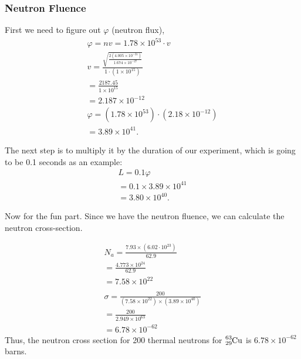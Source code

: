 \documentclass{article}
\begin{document}
\begin{multicols*}{2}
    \subsubsection{Neutron Fluence}
    First we need to figure out $\varphi$ (neutron flux),
    \begin{equation*}
      \begin{split}
        \varphi = nv = 1.78\times10^{53} \cdot v\\
        v = \frac{\sqrt{\frac{2\left(4.005\times10^{-21}\right)}{1.674\times10^{-27}}}}{1\cdot \left(1\times10^{15}\right)}\\
        = \frac{2187.45}{1\times10^{15}}\\
        = 2.187 \times 10^{-12}\\
        \varphi = \left(1.78\times10^{53}\right) \cdot \left(2.18 \times 10^{-12}\right)\\
        = \boxed{3.89 \times 10^{41}}.
      \end{split}
    \end{equation*}

    The next step is to multiply it by the duration of our experiment, which is going to
    be 0.1 seconds as an example:
    \begin{equation*}
      \begin{split}
      L = 0.1\varphi\\
      = 0.1 \times 3.89\times10^{41}\\
      = 3.80\times10^{40}.
      \end{split}
    \end{equation*}

    Now for the fun part. Since we have the neutron fluence, we can calculate the neutron
    cross-section.

    \begin{equation*}
      \begin{split}
        N_a = \frac{7.93 \times \left(6.02\cdot 10^{23}\right)}{62.9}\\
        = \frac{4.773\times 10^{24}}{62.9}\\
        = \boxed{7.58\times10^{22}}\\\\
        \sigma = \frac{200}{\left(7.58 \times 10^{22}\right) \times \left(3.89\times10^{40}\right)}\\
        = \frac{200}{2.949\times10^{63}}\\
        = \boxed{6.78 \times 10^{-62}}
      \end{split}
    \end{equation*}
    Thus, the neutron cross section for 200 thermal neutrons for $\ce{^{63}_{29}Cu}$ is
    $6.78 \times 10^{-62}\;$ barns.
  \end{multicols*}
\end{document}
